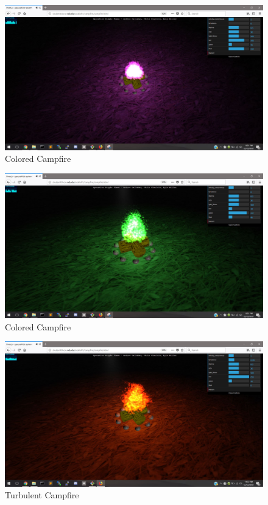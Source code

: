 \documentclass[letterpaper]{article}
\begin{document}
\begin{figure}[H]
\centering
\includegraphics[scale=.35]{result4.JPG}
\caption{Colored Campfire}
\label{fig:result4}
\end{figure}

\begin{figure}[H]
\centering
\includegraphics[scale=.35]{result5.JPG}
\caption{Colored Campfire}
\label{fig:result5}
\end{figure}

\begin{figure}[H]
\centering
\includegraphics[scale=.35]{result6.JPG}
\caption{Turbulent Campfire}
\label{fig:result6}
\end{figure}
\end{document}
